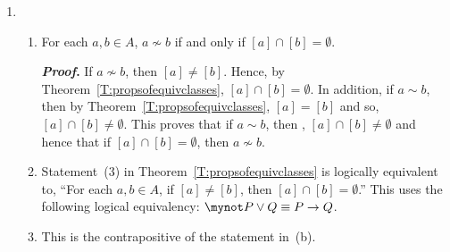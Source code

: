 \begin{enumerate}
\item \begin{enumerate}
\item For each  $a, b \in A$,    $a\nsim b$ if and only if   
        $\left[ a \right] \cap \left[ b \right] = \emptyset $.

\textbf{\emph{Proof}.}  If $a\nsim b$, then $\left[ a \right] \ne \left[ b \right]$.  Hence, by Theorem~\ref{T:propsofequivclasses}, $\left[ a \right] \cap \left[ b \right] = \emptyset $.  In addition, if $a \sim b$, then by Theorem~\ref{T:propsofequivclasses}, 
$\left[ a \right] = \left[ b \right]$ and so, 
$\left[ a \right] \cap \left[ b \right] \ne \emptyset $.  This proves that if $a \sim b$, then , $\left[ a \right] \cap \left[ b \right] \ne \emptyset $ and hence that if 
$\left[ a \right] \cap \left[ b \right] = \emptyset $, then $a \nsim b$.

\item Statement~(3) in Theorem~\ref{T:propsofequivclasses} is logically equivalent to, 
``For each  $a, b \in A$,   if  $\left[ a \right] \ne \left[ b \right]$, then   
$\left[ a \right] \cap \left[ b \right] = \emptyset $.''  This uses the following logical equivalency:  $\mynot P \vee Q \equiv P \to Q$.

\item This is the contrapositive of the statement in~(b).
\end{enumerate}
\end{enumerate}


